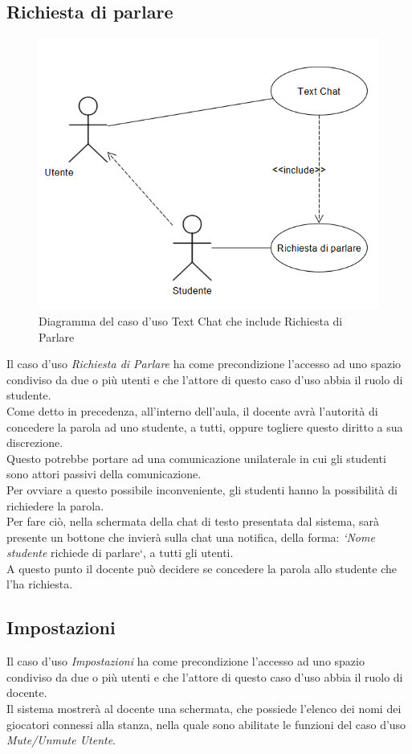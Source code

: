 \subsection{Richiesta di parlare} \label{Request}
\begin{figure}[H]
    \centering
    \includegraphics[scale=0.6]{Immagini/text.jpg}
    \caption{Diagramma del caso d'uso Text Chat che include Richiesta di Parlare}
    \label{fig:my_label}
\end{figure}
Il caso d'uso \textit{Richiesta di Parlare} ha come precondizione l'accesso ad uno spazio condiviso da due o più utenti e che l'attore di questo caso d'uso abbia il ruolo di studente.
\\Come detto in precedenza, all'interno dell'aula, il docente avrà l'autorità di concedere la parola ad uno studente, a tutti, oppure togliere questo diritto a sua discrezione. \\Questo potrebbe portare ad una comunicazione unilaterale in cui gli studenti sono attori passivi della comunicazione. \\Per ovviare a questo possibile inconveniente, gli studenti hanno la possibilità di richiedere la parola. \\Per fare ciò, nella schermata della chat di testo presentata dal sistema, sarà presente un bottone che invierà sulla chat una notifica, della forma: \textit{`Nome studente} richiede di parlare`, a tutti gli utenti. \\A questo punto il docente può decidere se concedere la parola allo studente che l'ha richiesta.
\subsection{Impostazioni}
Il caso d'uso \textit{Impostazioni} ha come precondizione l'accesso ad uno spazio condiviso da due o più utenti e che l'attore di questo caso d'uso abbia il ruolo di docente.
\\Il sistema mostrerà al docente una schermata, che possiede l'elenco dei nomi dei giocatori connessi alla stanza, nella quale sono abilitate le funzioni del caso d'uso \textit{Mute/Unmute Utente}.
